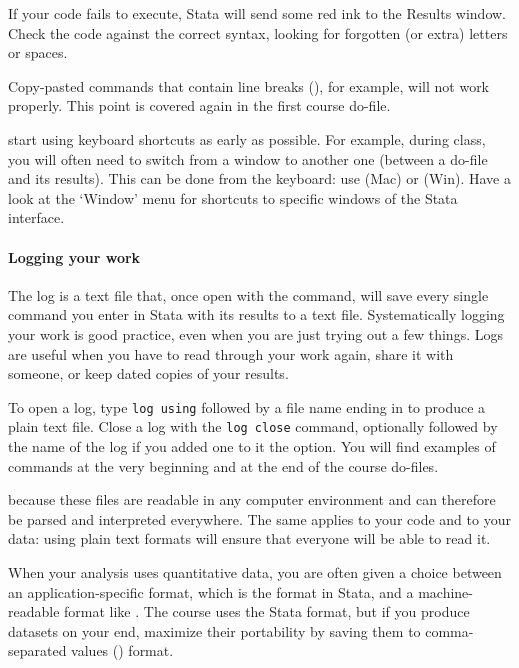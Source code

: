  If your code fails to execute, Stata will send some red ink to the Results window. Check the code against the correct syntax, looking for forgotten (or extra) letters or spaces.%

 Copy-pasted commands that contain line breaks (\cmd{///}), for example, will not work properly. This point is covered again in the first course do-file.%

 start using keyboard shortcuts as early as possible. For example, during class, you will often need to switch from a window to another one (between a do-file and its results). This can be done from the keyboard: use  (Mac) or  (Win). Have a look at the `Window' menu for shortcuts to specific windows of the Stata interface.%

\paragraph{Logging your work}

The log is a text file that, once open with the  command, will save every single command you enter in Stata with its results to a text file. Systematically logging your work is good practice, even when you are just trying out a few things. Logs are useful when you have to read through your work again, share it with someone, or keep dated copies of your results.%

To open a log, type \texttt{log using} followed by a file name ending in  to produce a plain text file. Close a log with the \texttt{log close} command, optionally followed by the name of the log if you added one to it the  option. You will find examples of  commands at the very beginning and at the end of the course do-files.%

%
 because these files are readable in any computer environment and can therefore be parsed and interpreted everywhere. The same applies to your code and to your data: using plain text formats will ensure that everyone will be able to read it.%

When your analysis uses quantitative data, you are often given a choice between an application-specific format, which is the  format in Stata, and a machine-readable format like . The course uses the Stata format, but if you produce datasets on your end, maximize their portability by saving them to comma-separated values () format.%

